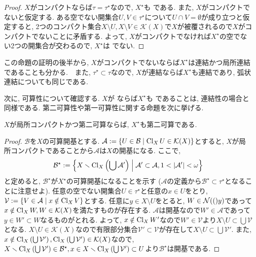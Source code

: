 \documentclass[uplatex, dvipdfmx, a4paper, 12pt, class=jsbook, crop=false]{standalone}
\begin{document}
\begin{proof}
	$ X $がコンパクトならば$ \tau = \tau^\star $なので, $ X^\star $も \Hausdorff である. また, $ X $がコンパクトでないと仮定する. ある空でない開集合$ U, V \in \tau^\star $について$ U \cap V = \emptyset $が成り立つと仮定すると, 2つのコンパクト集合$ X \setminus U, X \setminus V \in \mathcal{K}(X) $で$ X $が被覆されるので$ X $がコンパクトでないことに矛盾する. よって, $ X $がコンパクトでなければ$ X^\star $の空でない2つの開集合が交わるので, $ X^\star $は  でない.
\end{proof}

この命題の証明の後半から, $ X $がコンパクトでないならば$ X^\star $は連結かつ局所連結であることも分かる.　また, $ \tau^\star \subset \tau $なので, $ X $が連結ならば$ X^\star $も連結であり, 弧状連結についても同じである.

次に, 可算性について確認する. $ X $が \Lindelof ならば$ X^\star $も \Lindelof であることは, 連結性の場合と同様である. 第二可算性や第一可算性に関する命題を次に挙げる.
\begin{proposition}
	$ X $が局所コンパクトかつ第二可算ならば, $ X^\star $も第二可算である.
\end{proposition}

\begin{proof}
	$ \mathcal{B} $を$ X $の可算開基とする. $ \mathcal{A} \defeq \setcomp{U \in \mathcal{B}}{\topcl_{X}U \in \mathcal{K}(X)} $とすると, $ X $が局所コンパクトであることから$ \mathcal{A} $は$ X $の開基になる.
	ここで,
	$$ \mathcal{B}^\star \defeq \setcomp{X \setminus \topcl_{X} \left(\bigcup \mathcal{A}'\right)}{\mathcal{A}' \subset \mathcal{A}, 1 < \cardinality{\mathcal{A}'} < \omega} $$
	と定めると, $ \mathcal{B}^\star $が$ X^\star $の可算開基になることを示す ($ \mathcal{A} $の定義から$ \mathcal{B}^\star \subset \tau^\star $となることに注意せよ). 任意の空でない開集合$ U \in \tau^\star $と任意の$ x \in U $をとり, $ \mathcal{V} \defeq \setcomp{V \in \mathcal{A}}{x \notin \topcl_{X} V} $とする. 任意に$ y \in X \setminus U $をとると, $ W \in \topnbd(y) $であって$ x \notin \mathop{\mathrm{Cl}}\nolimits_X W, W \in \mathcal{K}(X) $を満たすものが存在する. $ \mathcal{A} $は開基なので$ W' \in \mathcal{A} $であって$ y \in W' \subset W $なるものがとれる. よって, $ x \notin \mathop{\mathrm{Cl}}\nolimits_X{W}' $なので$ W' \in \mathcal{V} $より$ X \setminus U \subset \bigcup \mathcal{V} $となる. $ X \setminus U \in \mathcal{K}(X) $なので有限部分集合$ \mathcal{V}' \subset \mathcal{V} $が存在して$ X \setminus U \subset \bigcup \mathcal{V}' $. また, $ x \notin \mathop{\mathrm{Cl}}\nolimits_X \left(\bigcup \mathcal{V}'\right), \mathop{\mathrm{Cl}}\nolimits_X\left(\bigcup \mathcal{V}'\right) \in \mathcal{K}(X) $なので, $ X \smallsetminus \mathop{\mathrm{Cl}}\nolimits_X \left(\bigcup \mathcal{V}'\right) \in \mathcal{B}^\star, x \in X \smallsetminus \mathop{\mathrm{Cl}}\nolimits_X \left(\bigcup \mathcal{V}'\right) \subset U $より$ \mathcal{B}^\star $は開基である.
\end{proof}
\end{document}
